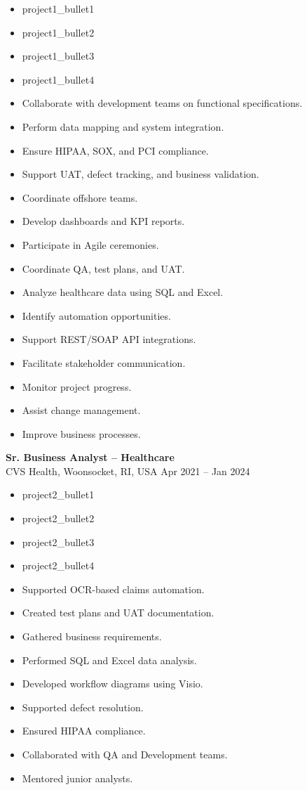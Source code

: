 \documentclass[a4paper,10pt]{article}
\begin{document}
\begin{itemize}[leftmargin=*]
\item {{project1_bullet1}}
\item {{project1_bullet2}}
\item {{project1_bullet3}}
\item {{project1_bullet4}}
\item Collaborate with development teams on functional specifications.
\item Perform data mapping and system integration.
\item Ensure HIPAA, SOX, and PCI compliance.
\item Support UAT, defect tracking, and business validation.
\item Coordinate offshore teams.
\item Develop dashboards and KPI reports.
\item Participate in Agile ceremonies.
\item Coordinate QA, test plans, and UAT.
\item Analyze healthcare data using SQL and Excel.
\item Identify automation opportunities.
\item Support REST/SOAP API integrations.
\item Facilitate stakeholder communication.
\item Monitor project progress.
\item Assist change management.
\item Improve business processes.
\end{itemize}

\vspace{4mm}

\textbf{Sr. Business Analyst -- Healthcare}\\
CVS Health, Woonsocket, RI, USA \hfill Apr 2021 -- Jan 2024

\begin{itemize}[leftmargin=*]
\item {{project2_bullet1}}
\item {{project2_bullet2}}
\item {{project2_bullet3}}
\item {{project2_bullet4}}
\item Supported OCR-based claims automation.
\item Created test plans and UAT documentation.
\item Gathered business requirements.
\item Performed SQL and Excel data analysis.
\item Developed workflow diagrams using Visio.
\item Supported defect resolution.
\item Ensured HIPAA compliance.
\item Collaborated with QA and Development teams.
\item Mentored junior analysts.
\end{itemize}
\end{document}
